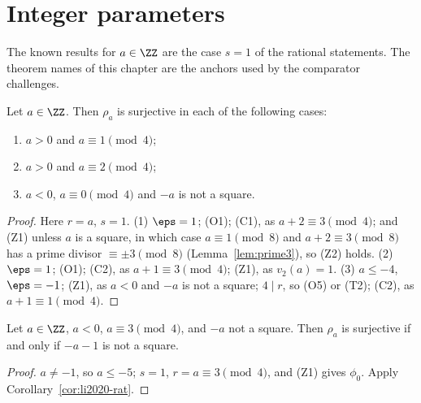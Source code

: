 \chapter{Integer parameters}
\label{chap:integers}

The known results for $a \in \ZZ$ are the case $s = 1$ of the rational statements. The theorem
names of this chapter are the anchors used by the comparator challenges.

\begin{corollary}
  \label{cor:stoll1992}
  \leanok
  Let $a \in \ZZ$. Then $\rho_a$ is surjective in each of the following cases:
  \begin{enumerate}
    \item $a > 0$ and $a \equiv 1 \pmod 4$;
    \item $a > 0$ and $a \equiv 2 \pmod 4$;
    \item $a < 0$, $a \equiv 0 \pmod 4$ and $-a$ is not a square.
  \end{enumerate}
\end{corollary}
\begin{proof}
  \leanok
  Here $r = a$, $s = 1$. (1) $\eps = 1$; (O1); (C1), as $a + 2 \equiv 3 \pmod 4$; and (Z1) unless
  $a$ is a square, in which case $a \equiv 1 \pmod 8$ and $a + 2 \equiv 3 \pmod 8$ has a prime
  divisor $\equiv \pm 3 \pmod 8$ (Lemma~\ref{lem:prime3}), so (Z2) holds. (2) $\eps = 1$; (O1);
  (C2), as $a + 1 \equiv 3 \pmod 4$;
  (Z1), as $v_2(a) = 1$. (3) $a \le -4$, $\eps = -1$; (Z1), as $a < 0$ and $-a$ is not a square;
  $4 \mid r$, so (O5) or (T2); (C2), as $a + 1 \equiv 1 \pmod 4$.
\end{proof}

\begin{corollary}
  \label{cor:li2020}
  \leanok
  Let $a \in \ZZ$, $a < 0$, $a \equiv 3 \pmod 4$, and $-a$ not a square. Then $\rho_a$ is
  surjective if and only if $-a - 1$ is not a square.
\end{corollary}
\begin{proof}
  \leanok
  $a \ne -1$, so $a \le -5$; $s = 1$, $r = a \equiv 3 \pmod 4$, and (Z1) gives $\phi_0$. Apply
  Corollary~\ref{cor:li2020-rat}.
\end{proof}

